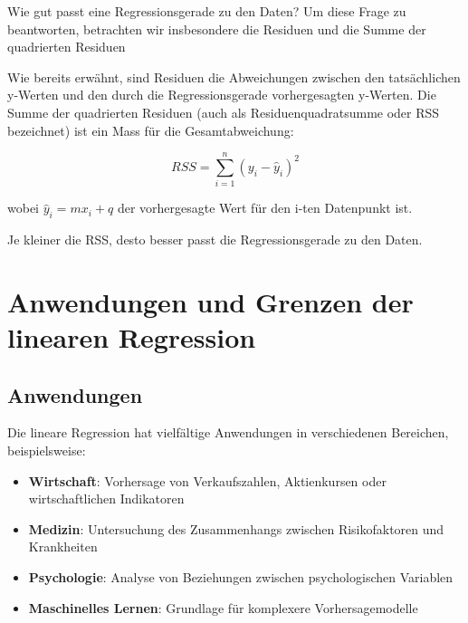 Wie gut passt eine Regressionsgerade zu den Daten? Um diese Frage zu beantworten, betrachten wir insbesondere die Residuen und die Summe der quadrierten Residuen

Wie bereits erwähnt, sind Residuen die Abweichungen zwischen den tatsächlichen y-Werten und den durch die Regressionsgerade vorhergesagten y-Werten. Die Summe der quadrierten Residuen (auch als Residuenquadratsumme oder RSS bezeichnet) ist ein Mass für die Gesamtabweichung:

\[RSS = \sum_{i=1}^{n} (y_i - \hat{y}_i)^2\]

wobei $\hat{y}_i = mx_i + q$ der vorhergesagte Wert für den i-ten Datenpunkt ist.

Je kleiner die RSS, desto besser passt die Regressionsgerade zu den Daten.

\section{Anwendungen und Grenzen der linearen Regression}

\subsection{Anwendungen}

Die lineare Regression hat vielfältige Anwendungen in verschiedenen Bereichen, beispielsweise:

\begin{itemize}
    \item \textbf{Wirtschaft}: Vorhersage von Verkaufszahlen, Aktienkursen oder wirtschaftlichen Indikatoren
    \item \textbf{Medizin}: Untersuchung des Zusammenhangs zwischen Risikofaktoren und Krankheiten
    \item \textbf{Psychologie}: Analyse von Beziehungen zwischen psychologischen Variablen
    \item \textbf{Maschinelles Lernen}: Grundlage für komplexere Vorhersagemodelle
\end{itemize}

\clearpage


